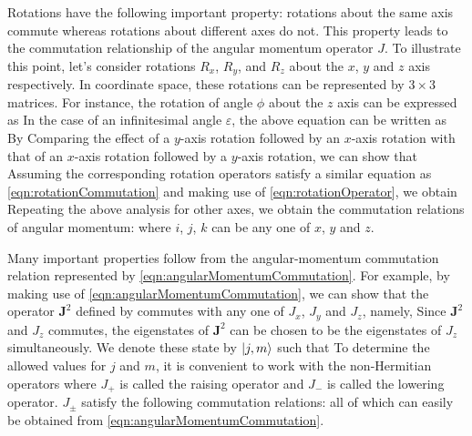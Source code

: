 Rotations have the following important property:  rotations about the same axis commute whereas rotations about 
different axes do not.  This property leads to the commutation relationship of the angular momentum operator $J$. 
To illustrate this point, let's consider rotations $R_x$, $R_y$, and $R_z$ about the $x$, $y$ and $z$ axis respectively. In 
coordinate space, these rotations can be represented by $3\times 3$ matrices. For instance, the rotation of angle $\phi$ about the $z$ axis can be expressed as
In the case of an infinitesimal angle $\varepsilon$, the above equation can be written as
By Comparing the effect of a $y$-axis rotation followed by an $x$-axis rotation with that of an $x$-axis rotation 
followed by a $y$-axis rotation, we can show that 
Assuming the corresponding rotation operators satisfy a similar equation as \autoref{eqn:rotationCommutation} and
making use of \autoref{eqn:rotationOperator}, we obtain
Repeating the above analysis for other axes, we obtain the commutation relations of angular momentum:
where $i$, $j$, $k$ can be any one of $x$, $y$ and $z$. 

Many important properties follow from the angular-momentum commutation relation represented by \autoref{eqn:angularMomentumCommutation}. For example, by making use of \autoref{eqn:angularMomentumCommutation}, we can show that the operator $\mathbf{J}^2$ defined by
commutes with any one of $J_x$, $J_y$ and $J_z$, namely,
Since $\mathbf{J}^2$ and $J_z$ commutes, the eigenstates of $\mathbf{J}^2$ can be chosen to be the eigenstates of
$J_z$ simultaneously. We denote these state by $| j, m \rangle$ such that
To determine the allowed values for $j$ and $m$, it is convenient to work with the non-Hermitian operators
where $J_{+}$ is called the raising operator and $J_{-}$ is called the lowering operator. $J_{\pm}$ satisfy the following
commutation relations:
all of which can easily be obtained from \autoref{eqn:angularMomentumCommutation}. 

